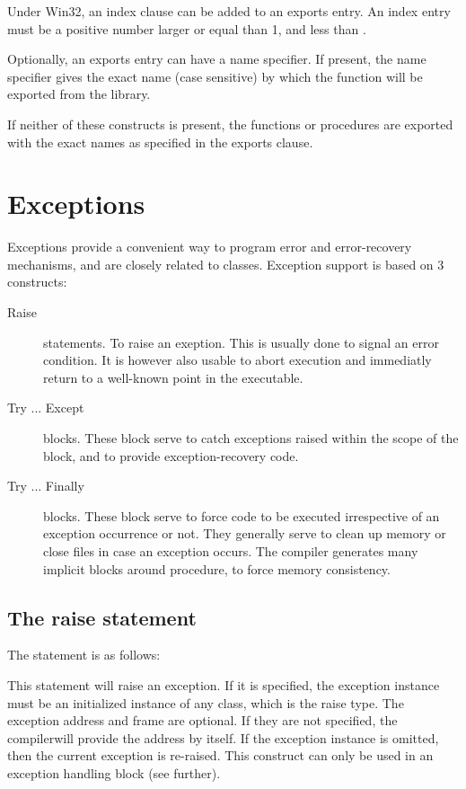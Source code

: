 

Under Win32, an index clause can be added to an exports entry.
An index entry must be a positive number larger or equal than 1, and less
than .

Optionally, an exports entry can have a name specifier. If present, the name
specifier gives the exact name (case sensitive) by which the function will
be exported from the library.

If neither of these constructs is present, the functions or procedures
are exported with the exact names as specified in the exports clause.

\chapter{Exceptions}
\label{ch:Exceptions}
Exceptions provide a convenient way to program error and error-recovery
mechanisms, and are closely related to classes.
Exception support is based on 3 constructs:
\begin{description}
\item [Raise\ ] statements. To raise an exeption. This is usually done to signal an
error condition. It is however also usable to
abort execution and immediatly return to a well-known point in the
executable.
\item [Try ... Except\ ] blocks. These block serve to catch exceptions
raised within the scope of the block, and to provide exception-recovery
code.
\item [Try ... Finally\ ] blocks. These block serve to force code to be
executed irrespective of an exception occurrence or not. They generally
serve to clean up memory or close files in case an exception occurs.
The compiler generates many implicit  blocks around
procedure, to force memory consistency.
\end{description}


\section{The raise statement}
The  statement is as follows:

This statement will raise an exception. If it is specified, the exception
instance must be an initialized instance of any class, which is the raise
type. The exception address and frame are optional. If they are not specified, 
the compilerwill provide the address by itself. If the exception instance is omitted, 
then the current exception is re-raised. This construct can only be used 
in an exception handling block (see further).

